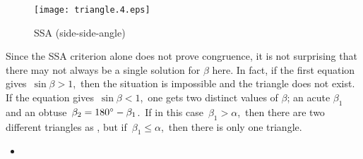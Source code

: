 \documentclass[12pt]{article}
\theoremstyle{definition}
\begin{document}
\begin{enumerate}
\begin{figure}[!htb]
\begin{center}
\texttt{[image: triangle.4.eps]}
\end{center}
\caption{SSA (side-side-angle)}
\end{figure}

Since the SSA criterion alone does not prove congruence,
it is not surprising that there may not always be a single solution 
for $\beta$ here.
In fact, if the first equation gives\, $\sin\beta > 1$,\, then the situation is impossible and the triangle does not exist.\, If the equation gives\, $\sin\beta < 1$,\, one gets two distinct values of $\beta$; an acute $\beta_1$ and an obtuse\, $\beta_2 = 180\sp\circ-\beta_1$.\, If in this case\, $\beta_1 > \alpha$,\, then there are two different triangles as , but if\, 
$\beta_1 \le \alpha$,\, then there is only one triangle.

\end{enumerate}

\begin{itemize}
\item
{}
\end{itemize}

\end{document}
